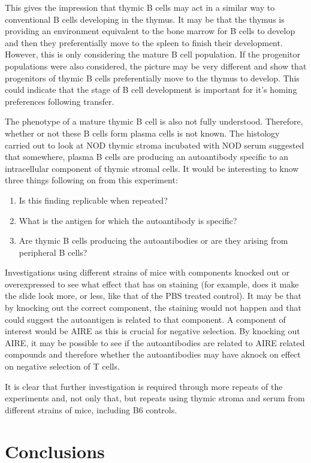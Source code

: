 This gives the impression that thymic B cells may act in a similar way to conventional B cells developing in the thymus.
It may be that the thymus is providing an environment equivalent to the bone marrow for B cells to develop and then they preferentially move to the spleen to finish their development.
However, this is only considering the mature B cell population.
If the progenitor populations were also considered, the picture  may be very different and show that progenitors of thymic B cells preferentially move to the thymus to develop.
This could indicate that the stage of B cell development is important for it's homing preferences following transfer.

The phenotype of a mature thymic B cell is also not fully understood.
Therefore, whether or not these B cells form plasma cells is not known.
The histology carried out to look at NOD thymic stroma incubated with NOD serum suggested that somewhere, plasma B cells are producing an autoantibody specific to an intracellular component of thymic stromal cells.
It would be interesting to know three things following on from this experiment:
\begin{enumerate}
\item Is this finding replicable when repeated?
\item What is the antigen for which the autoantibody is specific?
\item Are thymic B cells producing the autoantibodies or are they arising from peripheral B cells?
\end{enumerate}

Investigations using different strains of mice with components knocked out or overexpressed to see what effect that has on staining (for example, does it make the slide look more, or less, like that of the PBS treated control). 
It may be that by knocking out the correct component, the staining would not happen and that could suggest the autoantigen is related to that component. 
A component of interest would be AIRE as this is crucial for negative selection.
By knocking out AIRE, it may be possible to see if the autoantibodies are related to AIRE related compounds and therefore whether the autoantibodies may have aknock on effect on negative selection of T cells.

It is clear that further investigation is required through more repeats of the experiments and, not only that, but repeats using thymic stroma and serum from different strains of mice, including B6 controls.


\section{Conclusions}

